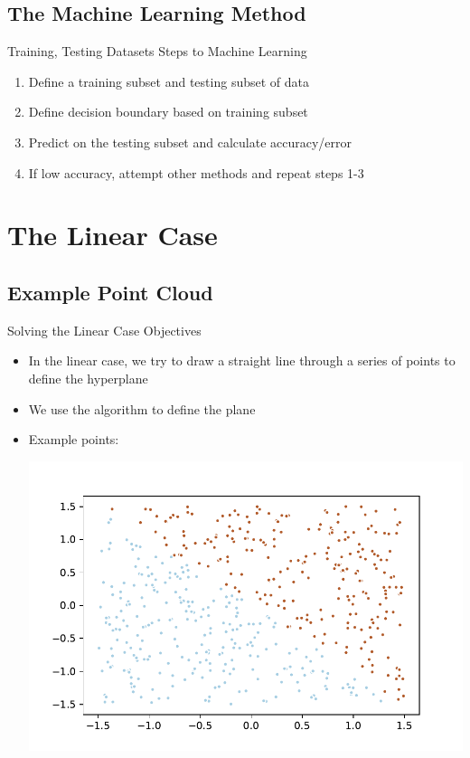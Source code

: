 \documentclass{beamer}
\begin{document}
\subsection{The Machine Learning Method}
\begin{frame}{Training, Testing Datasets}
Steps to Machine Learning
\begin{enumerate}
\item Define a training subset and testing subset of data
\item Define decision boundary based on training subset
\item Predict on the testing subset and calculate accuracy/error
\item If low accuracy, attempt other methods and repeat steps 1-3
\end{enumerate}
\end{frame}

\section{The Linear Case}
\subsection{Example Point Cloud}
\begin{frame}{Solving the Linear Case}
Objectives
\begin{itemize}
\item In the linear case, we try to draw a straight line through a series of points to define the hyperplane
\item We use the algorithm to define the plane
\item Example points:
\begin{center}
\includegraphics[scale=.6]{examples.pdf}
\end{center}
\end{itemize}
\end{frame}
\end{document}
